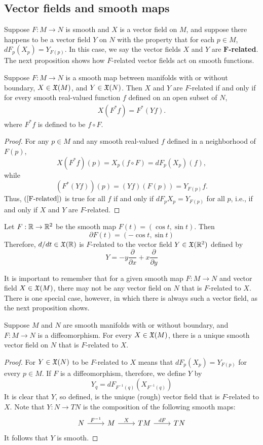 \subsection{Vector fields and smooth maps}
Suppose $F:M\to N$ is smooth and $X$ is a vector field on $M$, and suppose there happens to be a vector field $Y$ on $N$ with the property that for each $p\in M$, $dF_p(X_p)=Y_{F(p)}$. In this case, we say the vector fields $X$ and $Y$ are \textbf{$\bm{F}$-related}. The next proposition shows how $F$-related vector fields act on smooth functions.
\begin{proposition}\label{vector field F-related iff}
Suppose $F:M\to N$ is a smooth map between manifolds with or without boundary, $X\in\mathfrak{X}(M)$, and $Y\in\mathfrak{X}(N)$. Then $X$ and $Y$ are $F$-related if and only if for every smooth real-valued function $f$ defined on an open subset of $N$,
\begin{align}\label{F-related}
X(F^*f)=F^*(Yf).
\end{align}
where $F^*f$ is defined to be $f\circ F$.
\end{proposition}
\begin{proof}
For any $p\in M$ and any smooth real-valued $f$ defined in a neighborhood of $F(p)$,
\[X(F^*f)(p)=X_p(f\circ F)=dF_p(X_p)(f),\]
while
\[(F^*(Yf))(p)=(Yf)(F(p))=Y_{F(p)}f.\]
Thus, $(\ref{F-related})$ is true for all $f$ if and only if $dF_pX_p=Y_{F(p)}$ for all $p$, i.e., if and only if $X$ and $Y$ are $F$-related.
\end{proof}
\begin{example}
Let $F:\mathbb{R}\to\mathbb{R}^2$ be the smooth map $F(t)=(\cos t,\sin t)$. Then
\[\partial F(t)=(-\cos t,\sin t)\]
Therefore, $d/dt\in\mathfrak{X}(\mathbb{R})$ is $F$-related to the vector field $Y\in\mathfrak{X}(\mathbb{R}^2)$ defined by
\[Y=-y\frac{\partial}{\partial x}+x\frac{\partial}{\partial y}\]
\end{example}
It is important to remember that for a given smooth map $F:M\to N$ and vector
field $X\in\mathfrak{X}(M)$, there may not be any vector field on $N$ that is $F$-related to $X$. There is one special case, however, in which there is always such a vector field, as the next proposition shows.
\begin{proposition}\label{pushforward vector field}
Suppose $M$ and $N$ are smooth manifolds with or without boundary, and $F:M\to N$ is a diffeomorphism. For every $X\in\mathfrak{X}(M)$, there is a unique smooth vector field on $N$ that is $F$-related to $X$.
\end{proposition}
\begin{proof}
For $Y\in\mathfrak{X}(N)$ to be $F$-related to $X$ means that $dF_p(X_p)=Y_{F(p)}$ for every $p\in M$. If $F$ is a diffeomorphism, therefore, we define $Y$ by
\[Y_q=dF_{F^{-1}(q)}(X_{F^{-1}(q)})\]
It is clear that $Y$, so defined, is the unique (rough) vector field that is $F$-related to $X$. Note that $Y:N\to TN$ is the composition of the following smooth maps:
\[\begin{tikzcd}
N\ar[r,"F^{-1}"]&M\ar[r,"X"]&TM\ar[r,"dF"]&TN
\end{tikzcd}\]
It follows that $Y$ is smooth.
\end{proof}
